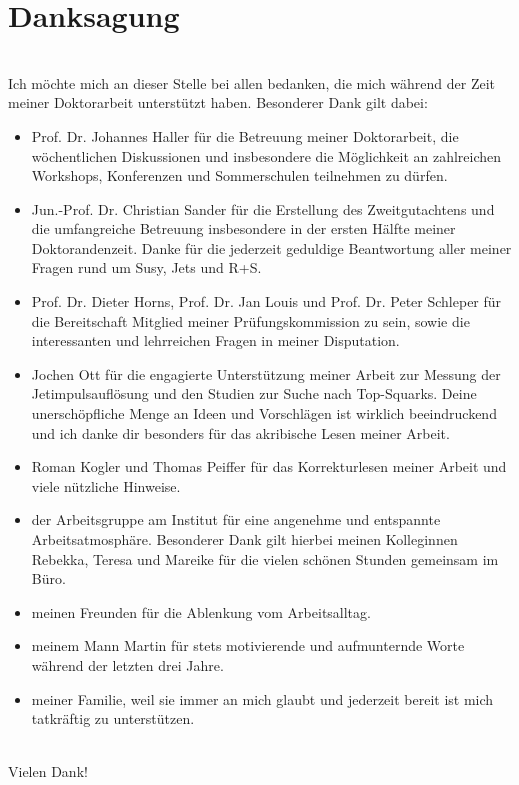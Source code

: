 \section*{Danksagung}
\ \\
Ich m\"ochte mich an dieser Stelle bei allen bedanken, die mich w\"ahrend der Zeit meiner Doktorarbeit unterst\"utzt haben. Besonderer Dank gilt dabei:
\begin{itemize}
\item Prof. Dr. Johannes Haller f\"ur die Betreuung meiner Doktorarbeit, die w\"ochentlichen Diskussionen und insbesondere die M\"oglichkeit an zahlreichen Workshops, Konferenzen und Sommerschulen teilnehmen zu d\"urfen.    
\item Jun.-Prof. Dr. Christian Sander f\"ur die Erstellung des Zweitgutachtens und die umfangreiche Betreuung insbesondere in der ersten H\"alfte meiner Doktorandenzeit. Danke f\"ur die jederzeit geduldige Beantwortung aller meiner Fragen rund um Susy, Jets und R+S.
\item Prof. Dr. Dieter Horns, Prof. Dr. Jan Louis und Prof. Dr. Peter Schleper f\"ur die Bereitschaft Mitglied meiner Pr\"ufungskommission zu sein, sowie die interessanten und lehrreichen Fragen in meiner Disputation.
\item Jochen Ott f\"ur die engagierte Unterst\"utzung meiner Arbeit zur Messung der Jetimpulsaufl\"osung und den Studien zur Suche nach Top-Squarks. Deine unersch\"opfliche Menge an Ideen und Vorschl\"agen ist wirklich beeindruckend und ich danke dir besonders f\"ur das akribische Lesen meiner Arbeit.
\item Roman Kogler und Thomas Peiffer f\"ur das Korrekturlesen meiner Arbeit und viele n\"utzliche Hinweise.
\item der Arbeitsgruppe am Institut f\"ur eine angenehme und entspannte Arbeitsatmosph\"are. Besonderer Dank gilt hierbei meinen Kolleginnen Rebekka, Teresa und Mareike f\"ur die vielen sch\"onen Stunden gemeinsam im B\"uro.
\item meinen Freunden f\"ur die Ablenkung vom Arbeitsalltag.
\item meinem Mann Martin f\"ur stets motivierende und aufmunternde Worte w\"ahrend der letzten drei Jahre.
\item meiner Familie, weil sie immer an mich glaubt und jederzeit bereit ist mich tatkr\"aftig zu unterst\"utzen.
\end{itemize}
\ \\
Vielen Dank!
